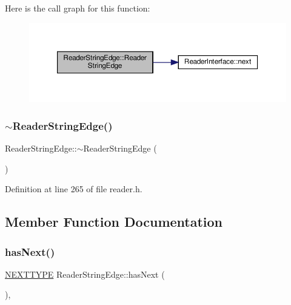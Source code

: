 Here is the call graph for this function\+:\nopagebreak
\begin{figure}[H]
\begin{center}
\leavevmode
\includegraphics[width=350pt]{classReaderStringEdge_acfd14224a4533371c4c2314d1434e65c_cgraph}
\end{center}
\end{figure}
\mbox{\label{classReaderStringEdge_a076dd2db15a1260c0bdf4d33e2144989}} 
\subsubsection{\texorpdfstring{$\sim$\+Reader\+String\+Edge()}{~ReaderStringEdge()}}
{\footnotesize\ttfamily Reader\+String\+Edge\+::$\sim$\+Reader\+String\+Edge (\begin{DoxyParamCaption}{ }\end{DoxyParamCaption})\hspace{0.3cm}{\ttfamily [inline]}}



Definition at line 265 of file reader.\+h.



\subsection{Member Function Documentation}
\mbox{\label{classReaderStringEdge_a7c43108413f8f867d5ee2cb35d777cd3}} 
\subsubsection{\texorpdfstring{has\+Next()}{hasNext()}}
{\footnotesize\ttfamily \hyperlink{classReaderInterface_ac2420ec8d2f60feadf2533d4fa77ec5e}{N\+E\+X\+T\+T\+Y\+PE} Reader\+String\+Edge\+::has\+Next (\begin{DoxyParamCaption}{ }\end{DoxyParamCaption})\hspace{0.3cm}{\ttfamily [inline]}, {\ttfamily [virtual]}}

